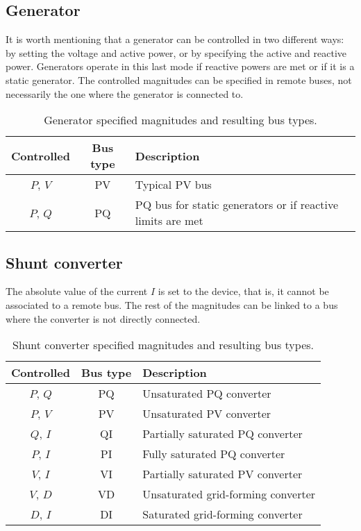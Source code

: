 \documentclass[11pt]{article}
\begin{document}
	\subsection{Generator}
	It is worth mentioning that a generator can be controlled in two different ways: by setting the voltage and active power, or by specifying the active and reactive power. Generators operate in this last mode if reactive powers are met or if it is a static generator. The controlled magnitudes can be specified in remote buses, not necessarily the one where the generator is connected to.

	\begin{table}[!htb]\centering
		\caption{Generator specified magnitudes and resulting bus types.}
			\begin{tabular}{ccp{12cm}}
				\hline
				\textbf{Controlled} & \textbf{Bus type} & \textbf{Description} \\
				\hline
				\hline
				$P$, $V$ & PV & Typical PV bus\\
				$P$, $Q$ & PQ & PQ bus for static generators or if reactive limits are met \\
				\hline
			\end{tabular}
	\end{table}

	\subsection{Shunt converter}
	The absolute value of the current $I$ is set to the device, that is, it cannot be associated to a remote bus. The rest of the magnitudes can be linked to a bus where the converter is not directly connected. 

	\begin{table}[!htb]\centering
		\caption{Shunt converter specified magnitudes and resulting bus types.}
			\begin{tabular}{ccp{12cm}}
				\hline
				\textbf{Controlled} & \textbf{Bus type} & \textbf{Description} \\
				\hline
				\hline
				$P$, $Q$ & PQ & Unsaturated PQ converter \\
				$P$, $V$ & PV & Unsaturated PV converter \\
				$Q$, $I$ & QI & Partially saturated PQ converter \\
				$P$, $I$ & PI & Fully saturated PQ converter \\
				$V$, $I$ & VI & Partially saturated PV converter \\
				$V$, $D$ & VD & Unsaturated grid-forming converter \\
				$D$, $I$ & DI & Saturated grid-forming converter \\
				\hline
			\end{tabular}
	\end{table}
\end{document}
